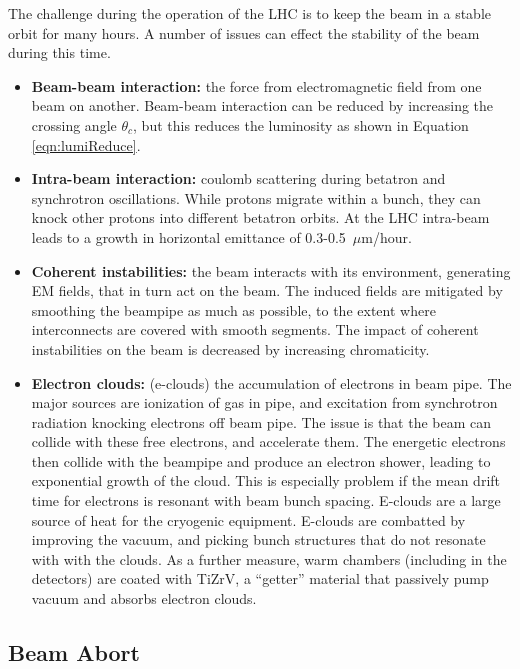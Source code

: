 The challenge during the operation of the LHC is to keep the beam in a stable orbit for many hours.
A number of issues can effect the stability of the beam during this time. \cite{lyndon}
\begin{itemize}
    \item \textbf{Beam-beam interaction:} the force from electromagnetic field from one beam on another. Beam-beam interaction can be reduced by increasing the crossing angle $\theta_c$, but this reduces the luminosity as shown in Equation \ref{eqn:lumiReduce}.
    \item \textbf{Intra-beam interaction:} coulomb scattering during betatron and synchrotron oscillations. While protons migrate within a bunch, they can knock other protons into different betatron orbits. At the LHC intra-beam leads to a growth in horizontal emittance of 0.3-0.5~$\mu$m/hour.
    \item \textbf{Coherent instabilities:} the beam interacts with its environment, generating EM fields, that in turn act on the beam. The induced fields are mitigated by smoothing the beampipe as much as possible, to the extent where interconnects are covered with smooth segments. The impact of coherent instabilities on the beam is decreased by increasing chromaticity.
    \item \textbf{Electron clouds:} (e-clouds) the accumulation of electrons in beam pipe. The major sources are ionization of gas in pipe, and excitation from synchrotron radiation knocking electrons off beam pipe. The issue is that the beam can collide with these free electrons, and accelerate them. The energetic electrons then collide with the beampipe and produce an electron shower, leading to exponential growth of the cloud. This is especially problem if the mean drift time for electrons is resonant with beam bunch spacing. E-clouds are a large source of heat for the cryogenic equipment. E-clouds are combatted by improving the vacuum, and picking bunch structures that do not resonate with with the clouds. As a further measure, warm chambers (including in the detectors) are coated with TiZrV, a ``getter'' material that passively pump vacuum and absorbs electron clouds.
\end{itemize}


\subsection{Beam Abort}

